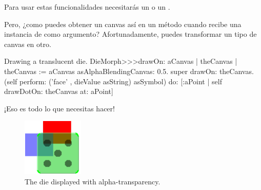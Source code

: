 \documentclass[a4paper,10pt,twoside]{book}
\begin{document}
Para usar estas funcionalidades necesitar\'as un  o un .

Pero, ¿como puedes obtener un canvas as\'i en un m\'etodo  cuando  recibe una instancia de  como argumento?
Afortunadamente, puedes transformar un tipo de canvas en otro.

\begin{method}{Drawing a translucent die.}
DieMorph>>>drawOn: aCanvas
	| theCanvas |
	theCanvas := aCanvas asAlphaBlendingCanvas: 0.5.
	super drawOn: theCanvas.
	(self perform: ('face' , dieValue asString) asSymbol)
		do: [:aPoint | self drawDotOn: theCanvas at: aPoint]
\end{method}
\noindent
¡Eso es todo lo que necesitas hacer!

\begin{figure}[ht]
	\centerline{\includegraphics[scale=0.7]{multiMorphs}}
	\caption{The die displayed with alpha-transparency.
		}
\end{figure}




\end{document}
